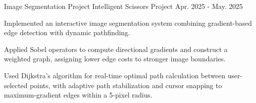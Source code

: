 \begin{cventries}
  \cventry
    {Image Segmentation Project} %
    {Intelligent Scissors Project} %
    {} %
    {Apr. 2025 - May. 2025} %
    {
      \begin{cvitems} %
        \item {Implemented an interactive image segmentation system combining gradient-based edge detection with dynamic pathfinding.}
        \item {Applied Sobel operators to compute directional gradients and construct a weighted graph, assigning lower edge costs to stronger image boundaries.}
        \item {Used Dijkstra's algorithm for real-time optimal path calculation between user-selected points, with adaptive path stabilization and cursor snapping to maximum-gradient edges within a 5-pixel radius.}
      \end{cvitems}
    }

\end{cventries}
